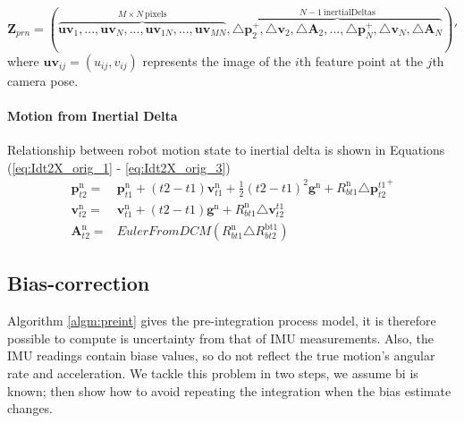\documentclass[12pt]{article}   %
\begin{document}
$$\textbf{Z}_{prn} = (\overbrace{\textbf{uv}_{1}, ... , \textbf{uv}_{N}, ..., \textbf{uv}_{1N}, ... , \textbf{uv}_{MN}}^{M \times N  \ {\mathrm{pixels}}}, \overbrace{\triangle \textbf{p}^+_2, \triangle  \textbf{v}_2, \triangle \textbf{A}_2, ..., \triangle  \textbf{p}^+_N, \triangle \textbf{v}_N, \triangle  \textbf{A}_N}^{N - 1 \ {\mathrm{inertialDeltas}}})' $$
where $\textbf{uv}_{ij} = (u_{ij}, v_{ij})$ represents the image of the $i$th feature point  at the $j$th camera pose.

\paragraph{Motion from Inertial Delta}
Relationship between robot motion state to inertial delta is shown in Equations (\ref{eq:Idt2X_orig_1} - \ref{eq:Idt2X_orig_3})
\begin{align}
\bm{p}^{\mathrm{n}}_{t2} = & \bm{p}^{\mathrm{n}}_{t1} + (t2 - t1) \bm{v}^{\mathrm{n}}_{t1} + 
\frac{1}{2} (t2 - t1 )^2 \bm{g}^{\mathrm{n}} + R^{\mathrm{n}}_{bt1} \triangle {\bm{p}^{t1}_{t2}}^+ 
\label{eq:Idt2X_orig_1}\\
\bm{v}^{\mathrm{n}}_{t2} = & \bm{v}^{\mathrm{n}}_{t1} + (t2 - t1 ) \bm{g}^{\mathrm{n}} + R^{\mathrm{n}}_{bt1} \triangle \bm{v}^{t1}_{t2} 
\label{eq:Idt2X_orig_2}\\
\bm{A}^{\mathrm{n}}_{t2} = & EulerFromDCM( R^{\mathrm{n}}_{bt1} \triangle R^{\mathrm{bt1}}_{bt2} )
\label{eq:Idt2X_orig_3}
\end{align}

\subsection{Bias-correction}
Algorithm \ref{algm:preint} gives the pre-integration process model, it is therefore possible to compute is uncertainty from that of IMU measurements. Also, the IMU readings contain biase values, so do not reflect the true motion's angular rate and acceleration. We tackle this problem in two steps, we assume bi is known; then show how to avoid repeating the integration when the bias estimate changes.
\end{document}
